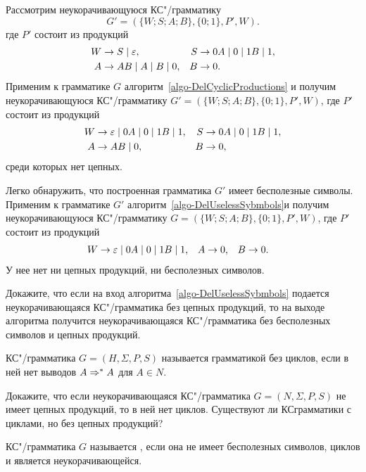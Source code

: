 \begin{myexample}
Рассмотрим неукорачивающуюся КС"/грамматику
\[
    G'=(\{W;S;A;B\},\{0;1\},P',W).
\]
где $P'$ состоит из продукций
\begin{align*}
	W & \to S \mid \varepsilon, &
	S &\to 0A \mid 0 \mid 1B \mid 1, \\
    A &\to AB \mid A \mid B \mid 0, &
	B &\to 0.
\end{align*}
Применим к грамматике $G$ алгоритм~\ref{algo-DelCyclicProductions} и получим неукорачивающуюся КС"/грамматику $G'=(\{W;S;A;B\},\{0;1\},P',W)$, где $P'$ состоит из продукций
\begin{align*}
	W &\to \varepsilon \mid 0A \mid 0 \mid 1B \mid 1, &
    S &\to 0A \mid 0 \mid 1B \mid 1, \\
    A &\to AB \mid 0, &
    B &\to 0,
\end{align*}
среди которых нет цепных.

Легко обнаружить, что построенная грамматика $G'$ имеет бесполезные символы. Применим к грамматике $G'$ алгоритм~\ref{algo-DelUselessSybmbols}и получим неукорачивающуюся КС"/грамматику $G=(\{W;S;A;B\},\{0;1\},P',W)$, где $P'$ состоит из продукций
\begin{align*}
	W &\to \varepsilon \mid 0A \mid 0 \mid 1B \mid 1, &
    A &\to 0, &
    B &\to 0.
\end{align*}
У нее нет ни цепных продукций, ни бесполезных символов.
\end{myexample}

\begin{myproblem}
\label{problem-GrammarToEpsFreeGrammarWOCyclicSymbols}
Докажите, что если на вход алгоритма~\ref{algo-DelUselessSybmbols} подается неукорачивающаяся КС"/грамматика без цепных продукций, то на выходе алгоритма получится неукорачивающаяся КС"/грамматика без бесполезных символов и цепных продукций.

КС"/грамматика $G=(H,\Sigma,P,S)$ называется грамматикой без циклов, если в ней нет выводов $A\Rightarrow^*A$ для $A\in N$.
\end{myproblem}

\begin{myproblem}
Докажите, что если неукорачивающаяся КС"/грамматика $G=(N,\Sigma,P,S)$ не имеет цепных продукций, то в ней нет циклов. Существуют ли КС\-грамматики с циклами, но без цепных продукций?
\end{myproblem}

КС"/грамматика $G$ называется , если она не имеет бесполезных символов, циклов и является неукорачивающейся.

